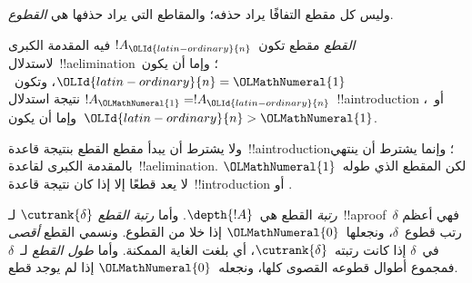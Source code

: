 \documentclass[../../../include/open-logic-section]{subfiles}
\begin{document}
وليس كل مقطع التفافًا يراد حذفه؛ والمقاطع التي يراد حذفها هي
\emph{القطوع}.

\begin{defn}
\emph{القطع} مقطع تكون~$!A_{\OLId{latin-ordinary}{n}}$ فيه المقدمة الكبرى لاستدلال~!!a{elimination}؛
وإما أن يكون~${\OLId{latin-ordinary}{n}}={\OLMathNumeral{1}}$، وتكون~$!A_{\OLMathNumeral{1}}=!A_{\OLId{latin-ordinary}{n}}$ نتيجة استدلال~!!a{introduction}
أو~\FalseInt، وإما أن يكون~${\OLId{latin-ordinary}{n}}>{\OLMathNumeral{1}}$.
\end{defn}

ولا يشترط أن يبدأ مقطع القطع بنتيجة قاعدة~!!a{introduction}؛ وإنما
يشترط أن ينتهي بالمقدمة الكبرى لقاعدة~!!a{elimination}. لكن المقطع الذي
طوله~${\OLMathNumeral{1}}$ لا يعد قطعًا إلا إذا كان نتيجة قاعدة~!!{introduction} أو
\FalseInt.

\begin{defn}
\emph{رتبة} القطع هي~$\depth{!A}$. وأما \emph{رتبة القطع}
$\cutrank{\delta}$ لـ~!!a{proof}~$\delta$ فهي أعظم رتب قطوع~$\delta$،
ونجعلها~${\OLMathNumeral{0}}$ إذا خلا من القطوع. ونسمي القطع \emph{أقصى} في~$\delta$ إذا
كانت رتبته~$\cutrank{\delta}$، أي بلغت الغاية الممكنة. وأما
\emph{طول القطع} لـ~$\delta$ فمجموع أطوال قطوعه القصوى كلها، ونجعله~${\OLMathNumeral{0}}$
إذا لم يوجد قطع.
\end{defn}
\end{document}
